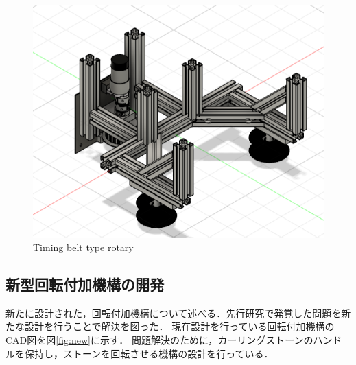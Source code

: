 \documentclass{classes/sice-si}
\begin{document}
\begin{figure}[h]
\begin{minipage}{0.4\linewidth}
        \centering
        \includegraphics[width=\linewidth]{figures/3.png}
        \caption{Timing belt type rotary}
        \label{fig:three}
    \end{minipage}
    \vspace{0pt} %
\end{figure}
\subsection{新型回転付加機構の開発}
新たに設計された，回転付加機構について述べる．先行研究で発覚した問題を新たな設計を行うことで解決を図った．
現在設計を行っている回転付加機構のCAD図を図\ref{fig:new}に示す．
問題解決のために，カーリングストーンのハンドルを保持し，ストーンを回転させる機構の設計を行っている．
\end{document}
